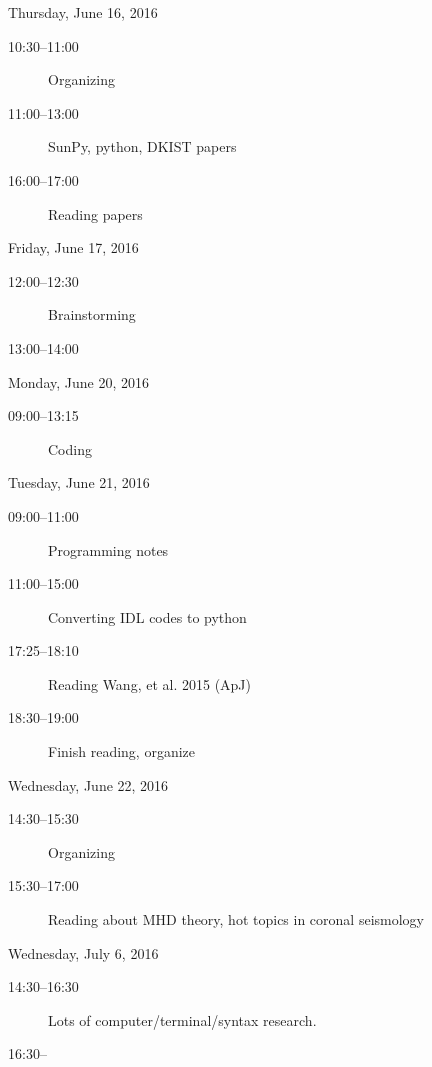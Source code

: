 \documentclass{article}
\newcommand{\mydate}[1]{\textcolor{cadmiumgreen}{#1}}
\begin{document}
\mydate{Thursday, June 16, 2016}
\begin{description}
    \item [10:30--11:00] Organizing
    \item [11:00--13:00] SunPy, python, DKIST papers
    \item [16:00--17:00] Reading papers
\end{description}
\mydate{Friday, June 17, 2016}
\begin{description}
    \item [12:00--12:30] Brainstorming
    \item [13:00--14:00]
\end{description}
\mydate{Monday, June 20, 2016}
\begin{description}
    \item [09:00--13:15] Coding
\end{description}
\mydate{Tuesday, June 21, 2016}
\begin{description}
    \item [09:00--11:00] Programming notes
    \item [11:00--15:00] Converting IDL codes to python
    \item [17:25--18:10] Reading Wang, et al. 2015 (ApJ)
    \item [18:30--19:00] Finish reading, organize
\end{description}

\mydate{Wednesday, June 22, 2016}
\begin{description}
    \item [14:30--15:30] Organizing
    \item [15:30--17:00] Reading about MHD theory, hot topics in
        coronal seismology
\end{description}

\mydate{Wednesday, July 6, 2016}
\begin{description}
    \item [14:30--16:30] Lots of computer/terminal/syntax research.
    \item [16:30--]
\end{description}
\end{document}
